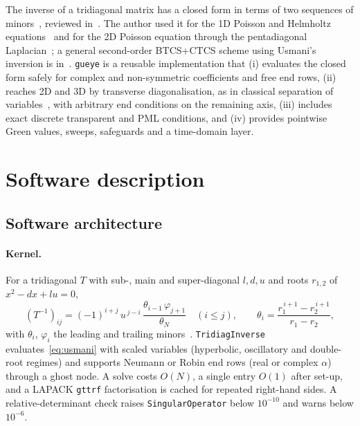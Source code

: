 \documentclass[preprint,12pt,a4paper]{elsarticle}
\newcommand{\gueye}{\texttt{gueye}}
\begin{document}
The inverse of a tridiagonal matrix has a closed form in terms of two sequences of minors~\cite{Usmani1994,HuOConnell1996,DaFonsecaPetronilho2001}, reviewed in~\cite{Meurant1992}.
The author used it for the 1D Poisson and Helmholtz equations~\cite{Gueye2014a,Gueye2014b,Gueye2014c,Gueye2014d} and for the 2D Poisson equation through the pentadiagonal Laplacian~\cite{Gueye2022}; a general second-order BTCS+CTCS scheme using Usmani's inversion is in~\cite{Gueye2021}.
\gueye{} is a reusable implementation that (i) evaluates the closed form safely for complex and non-symmetric coefficients and free end rows, (ii) reaches 2D and 3D by transverse diagonalisation, as in classical separation of variables~\cite{LynchRiceThomas1964}, with arbitrary end conditions on the remaining axis, (iii) includes exact discrete transparent and PML conditions, and (iv) provides pointwise Green values, sweeps, safeguards and a time-domain layer.

\section{Software description}
\subsection{Software architecture}
\paragraph{Kernel.}
For a tridiagonal $T$ with sub-, main and super-diagonal $l,d,u$ and roots $r_{1,2}$ of $x^2-dx+lu=0$,
\begin{equation}\label{eq:usmani}
(T^{-1})_{ij}=(-1)^{i+j}\,u^{\,j-i}\,\frac{\theta_{i-1}\,\varphi_{j+1}}{\theta_N}\quad(i\le j),\qquad
\theta_i=\frac{r_1^{\,i+1}-r_2^{\,i+1}}{r_1-r_2},
\end{equation}
with $\theta_i$, $\varphi_i$ the leading and trailing minors~\cite{Usmani1994}.
\texttt{TridiagInverse} evaluates~\eqref{eq:usmani} with scaled variables (hyperbolic, oscillatory and double-root regimes) and supports Neumann or Robin end rows (real or complex $\alpha$) through a ghost node.
A solve costs $O(N)$, a single entry $O(1)$ after set-up, and a LAPACK \texttt{gttrf} factorisation is cached for repeated right-hand sides.
A relative-determinant check raises \texttt{SingularOperator} below $10^{-10}$ and warns below $10^{-6}$.
\end{document}
